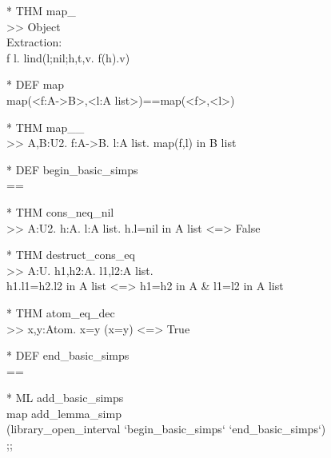 \begin{prl*}
\>* THM map\_\\
\>  >> Object\\
\>  Extraction:\\
\>  \mlambda{} f l. lind(l;nil;h,t,v. f(h).v)
\end{prl*}

\begin{prl*}
\>* DEF map\\
\>  map(<f:A-\mbackslash{}>B>,<l:A list>)==map(<f>,<l>)
\end{prl*}

\begin{prl*}
\>* THM map\_\_\\
\>  >> \mforall{}A,B:U2. \mforall{}f:A->B. \mforall{}l:A list. map(f,l) in B list
\end{prl*}

\begin{prl*}
\>* DEF begin\_basic\_simps\\
\>  ==
\end{prl*}

\begin{prl*}
\>* THM cons\_neq\_nil\\
\>  >> \mforall{}A:U2. \mforall{}h:A. \mforall{}l:A list. h.l=nil in A list <=> False
\end{prl*}

\begin{prl*}
\>* THM destruct\_cons\_eq\\
\>  >> \mforall{}A:U. \mforall{}h1,h2:A. \mforall{}l1,l2:A list. \\
\>    h1.l1=h2.l2 in A list <=> h1=h2 in A \& l1=l2 in A list
\end{prl*}

\begin{prl*}
\>* THM atom\_eq\_dec\\
\>  >> \mforall{}x,y:Atom. x=y \mvee{} \mneg{}(x=y) <=> True
\end{prl*}

\begin{prl*}
\>* DEF end\_basic\_simps\\
\>  ==
\end{prl*}

\begin{prl*}
\>* ML add\_basic\_simps\\
\>  map add\_lemma\_simp \\
\>      (library\_open\_interval `begin\_basic\_simps` `end\_basic\_simps`)\\
\>  ;;
\end{prl*}


